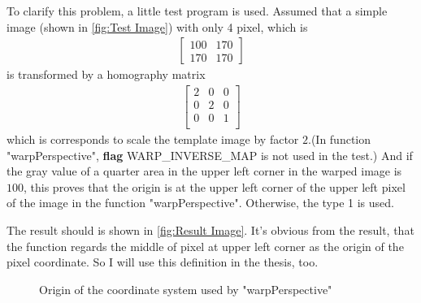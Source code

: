 To clarify this problem, a little test program is used. Assumed that a simple image (shown in \cref{fig:Test Image}) with only 4 pixel, which is 
\begin{align}
\begin{bmatrix}
100&170\\
170&170 
\end{bmatrix} \nonumber
\end{align}
is transformed by a homography matrix
\begin{align}
\begin{bmatrix}
2&0&0\\
0&2&0\\
0&0&1\\
\end{bmatrix} \nonumber
\end{align}
which is corresponds to scale the template image by factor $2$.(In function "warpPerspective", \textbf{flag} WARP\_INVERSE\_MAP is not used in the test.) And if the gray value of a quarter area in the upper left corner in the warped image is $100$, this proves that the origin is at the upper left corner of the upper left pixel of the image in the function "warpPerspective". Otherwise, the type 1 is used. 

The result should is shown in \cref{fig:Result Image}. It's obvious from the result, that the function regards the middle of pixel at upper left corner as the origin of the pixel coordinate. So I will use this definition in the thesis, too.
\begin{figure}[htbp]\centering
	 \qquad
	\caption{Origin of the coordinate system used by "warpPerspective"}
	\label{fig:Searching Origin}
\end{figure}

